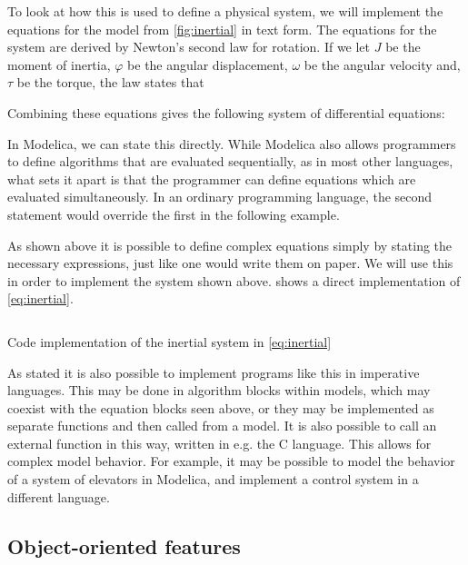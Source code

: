 \documentclass[\rootfolder/main.tex]{subfiles}
\begin{document}
\inputminted[fontsize=\footnotesize]{Modelica}{\rootfolder/Chapters/Chapter2/Listings/simultaneous.txt}

To look at how this is used to define a physical system, we will implement the equations for the model from \cref{fig:inertial} in text form.
The equations for the system are derived by Newton's second law for rotation.
If we let $J$ be the moment of inertia, $\varphi$ be the angular displacement, $\omega$ be the angular velocity and, $\tau$ be the torque, the law states that


Combining these equations gives the following system of differential equations:


In Modelica, we can state this directly.
While Modelica also allows programmers to define algorithms that are evaluated sequentially, as in most other languages, what sets it apart is that the programmer can define equations which are evaluated simultaneously.
In an ordinary programming language, the second statement would override the first in the following example.

As shown above it is possible to define complex equations simply by stating the necessary expressions, just like one would write them on paper.
We will use this in order to implement the system shown above.
 shows a direct implementation of \cref{eq:inertial}.

\begin{listing}[ht]
    \inputminted[fontsize=\footnotesize]{Modelica}{\rootfolder/Models/MasterProject/Models/InertialCode.mo}
    \caption{Code implementation of the inertial system in \cref{eq:inertial}}
    \label{lst:inertial-code}
\end{listing}

As stated it is also possible to implement programs like this in imperative languages.
This may be done in algorithm blocks within models, which may coexist with the equation blocks seen above, or they may be implemented as separate functions and then called from a model.
It is also possible to call an external function in this way, written in e.g. the C language.
This allows for complex model behavior.
For example, it may be possible to model the behavior of a system of elevators in Modelica, and implement a control system in a different language.

\subsection{Object-oriented features}
\end{document}
